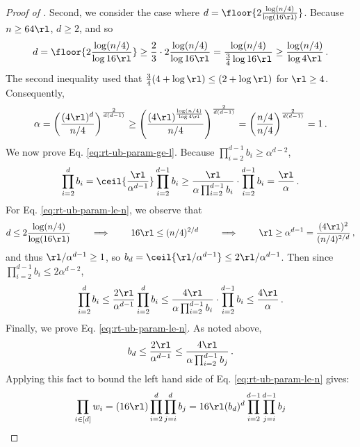 \begin{proof}[Proof of ]
  Second, we consider the case where $d = \floor{2 \frac{\log (n/4)}{\log(16\rl)}}$. Because $n \ge 64 \rl$, $d \ge 2$, and so
  \begin{align*}
    d = \floor{2 \frac{\log (n/4)}{\log 16 \rl}} \ge \frac{2}{3} \cdot 2 \frac{\log (n/4)}{\log 16 \rl} = \frac{\log (n/4)}{\frac{3}{4} \log 16 \rl} \ge \frac{\log (n / 4)}{\log 4 \rl} \,.
  \end{align*}
  The second inequality used that $\frac{3}{4} (4 + \log \rl) \le (2 + \log \rl)$ for $\rl \ge 4$. Consequently,
  \begin{align*}
    \alpha = \left(\frac{(4 \rl)^{d}}{n/4}\right)^{\frac{2}{d(d-1)}} \ge \left(\frac{(4 \rl)^{\frac{\log (n / 4)}{\log 4 \rl}}}{n/4}\right)^{\frac{2}{d(d-1)}} =  \left(\frac{n/4}{n/4}\right)^{\frac{2}{d(d-1)}} = 1 \,.
  \end{align*}
  We now prove Eq. \ref{eq:rt-ub-param-ge-l}. Because $\prod_{i=2}^{d-1} b_i \ge \alpha^{d - 2}$,
  \begin{align*}
    \prod_{i=2}^{d} b_i = \ceil{\frac{\rl}{\alpha^{d - 1}}} \prod_{i=2}^{d-1} b_i \ge \frac{\rl}{\alpha \prod_{i=2}^{d-1} b_i} \cdot \prod_{i=2}^{d-1} b_i = \frac{\rl}{\alpha} \,.
  \end{align*}
  For Eq. \ref{eq:rt-ub-param-le-n}, we observe that
  \begin{align*}
    d \le 2 \frac{\log(n/4)}{\log(16 \rl)}  \qquad \implies \qquad 16\rl \le (n/4)^{2/d} \qquad \implies \qquad \rl \ge \alpha^{d - 1} =\frac{(4 \rl)^2}{(n/4)^{2/d}} \,,
  \end{align*}
  and thus $\rl / \alpha^{d - 1} \ge 1$, so $b_d = \ceil{\rl / \alpha^{d -1}} \le 2 \rl / \alpha^{d - 1}$. Then since  $\prod_{i=2}^{d-1} b_i \le 2 \alpha^{d - 2}$,
  \begin{align*}
    \prod_{i=2}^{d} b_i \le \frac{2 \rl}{\alpha^{d - 1}} \prod_{i=2}^{d} b_i \le \frac{4 \rl}{\alpha \prod_{i=2}^{d-1} b_i} \cdot \prod_{i=2}^{d-1} b_i \le \frac{4 \rl}{\alpha} \,.
  \end{align*}
  Finally, we prove Eq. \ref{eq:rt-ub-param-le-n}. As noted above,
  \begin{align*}
    b_d \le \frac{2 \rl}{\alpha^{d-1}} \le \frac{4 \rl}{\alpha \prod_{i=2}^{d-1} b_j} \,.
  \end{align*}
  Applying this fact to bound the left hand side of Eq. \ref{eq:rt-ub-param-le-n} gives:
  \begin{align*}
    \prod_{i \in [d]} w_i &= (16 \rl) \prod_{i = 2}^d \prod_{j=i}^d b_j = 16 \rl (b_d)^d \prod_{i = 2}^{d-1} \prod_{j=i}^{d-1} b_j \\

\end{align*}
\end{proof}

